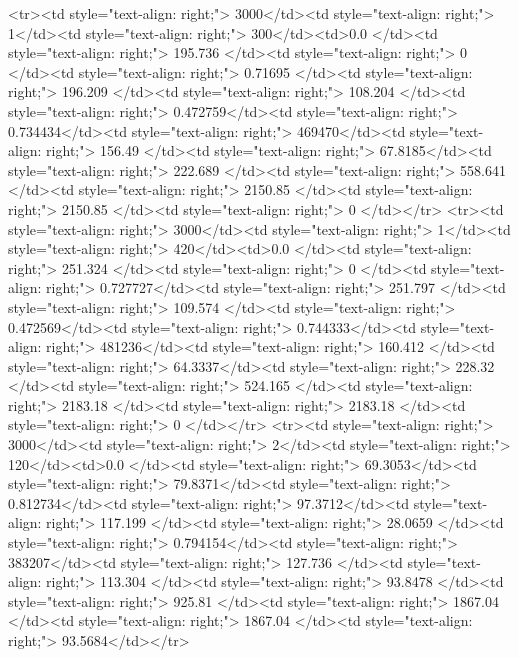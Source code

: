 <tr><td style="text-align: right;">      3000</td><td style="text-align: right;">         1</td><td style="text-align: right;">           300</td><td>0.0          </td><td style="text-align: right;">               195.736 </td><td style="text-align: right;">             0     </td><td style="text-align: right;">         0.71695 </td><td style="text-align: right;">        196.209 </td><td style="text-align: right;">           108.204 </td><td style="text-align: right;">               0.472759</td><td style="text-align: right;">             0.734434</td><td style="text-align: right;">              469470</td><td style="text-align: right;">                      156.49  </td><td style="text-align: right;">            67.8185</td><td style="text-align: right;">               222.689  </td><td style="text-align: right;">       558.641 </td><td style="text-align: right;">   2150.85 </td><td style="text-align: right;">      2150.85 </td><td style="text-align: right;">                  0     </td></tr>
<tr><td style="text-align: right;">      3000</td><td style="text-align: right;">         1</td><td style="text-align: right;">           420</td><td>0.0          </td><td style="text-align: right;">               251.324 </td><td style="text-align: right;">             0     </td><td style="text-align: right;">         0.727727</td><td style="text-align: right;">        251.797 </td><td style="text-align: right;">           109.574 </td><td style="text-align: right;">               0.472569</td><td style="text-align: right;">             0.744333</td><td style="text-align: right;">              481236</td><td style="text-align: right;">                      160.412 </td><td style="text-align: right;">            64.3337</td><td style="text-align: right;">               228.32   </td><td style="text-align: right;">       524.165 </td><td style="text-align: right;">   2183.18 </td><td style="text-align: right;">      2183.18 </td><td style="text-align: right;">                  0     </td></tr>
<tr><td style="text-align: right;">      3000</td><td style="text-align: right;">         2</td><td style="text-align: right;">           120</td><td>0.0          </td><td style="text-align: right;">                69.3053</td><td style="text-align: right;">            79.8371</td><td style="text-align: right;">         0.812734</td><td style="text-align: right;">         97.3712</td><td style="text-align: right;">           117.199 </td><td style="text-align: right;">              28.0659  </td><td style="text-align: right;">             0.794154</td><td style="text-align: right;">              383207</td><td style="text-align: right;">                      127.736 </td><td style="text-align: right;">           113.304 </td><td style="text-align: right;">                93.8478 </td><td style="text-align: right;">       925.81  </td><td style="text-align: right;">   1867.04 </td><td style="text-align: right;">      1867.04 </td><td style="text-align: right;">                 93.5684</td></tr>
